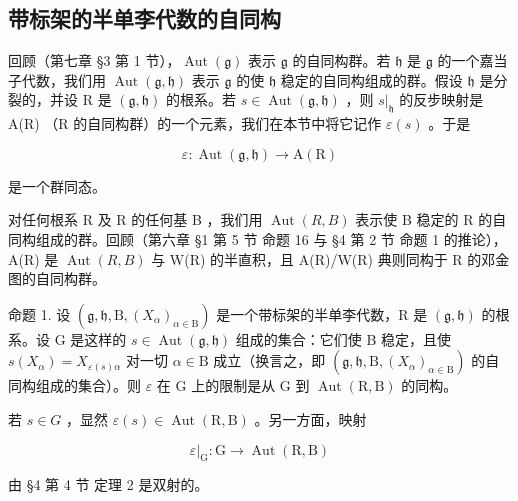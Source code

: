 \subsection{带标架的半单李代数的自同构}

回顾（第七章 §3 第 1 节），\(\operatorname{Aut}(\mathfrak{g})\) 表示 \(\mathfrak{g}\) 的自同构群。若 \(\mathfrak{h}\) 是 \(\mathfrak{g}\) 的一个嘉当子代数，我们用 \(\operatorname{Aut}(\mathfrak{g},\mathfrak{h})\) 表示 \(\mathfrak{g}\) 的使 \(\mathfrak{h}\) 稳定的自同构组成的群。假设 \(\mathfrak{h}\) 是分裂的，并设 R 是 \((\mathfrak{g},\mathfrak{h})\) 的根系。若 \(s\in\operatorname{Aut}(\mathfrak{g},\mathfrak{h})\) ，则 \(s|_{\mathfrak{h}}\) 的反步映射是 A(R) （R 的自同构群）的一个元素，我们在本节中将它记作 \(\varepsilon(s)\) 。于是

\[
\varepsilon : \operatorname{Aut} (\mathfrak {g}, \mathfrak {h}) \to \mathrm{A} (\mathrm{R})
\]

是一个群同态。

对任何根系 R 及 R 的任何基 B ，我们用 \(\operatorname{Aut}(R,B)\) 表示使 B 稳定的 R 的自同构组成的群。回顾（第六章 §1 第 5 节 命题 16 与 §4 第 2 节 命题 1 的推论），A(R) 是 \(\operatorname{Aut}(R,B)\) 与 W(R) 的半直积，且 A(R)/W(R) 典则同构于 R 的邓金图的自同构群。

命题 1. 设 \((\mathfrak{g},\mathfrak{h},\mathrm{B},(X_{\alpha})_{\alpha \in \mathrm{B}})\) 是一个带标架的半单李代数，R 是 \((\mathfrak{g},\mathfrak{h})\) 的根系。设 G 是这样的 \(s\in \operatorname {Aut}(\mathfrak{g},\mathfrak{h})\) 组成的集合：它们使 B 稳定，且使 \(s(X_{\alpha}) = X_{\varepsilon (s)\alpha}\) 对一切 \(\alpha \in \mathrm{B}\) 成立（换言之，即 \((\mathfrak{g},\mathfrak{h},\mathrm{B},(X_{\alpha})_{\alpha \in \mathrm{B}})\) 的自同构组成的集合）。则 \(\varepsilon\) 在 \(\mathrm{G}\) 上的限制是从 \(\mathrm{G}\) 到 \(\operatorname {Aut}(\mathrm{R},\mathrm{B})\) 的同构。

若 \(s \in G\) ，显然 \(\varepsilon(s) \in \operatorname{Aut}(\mathrm{R}, \mathrm{B})\) 。另一方面，映射

\[
\varepsilon|_{\mathrm{G}}: \mathrm{G} \rightarrow \operatorname{Aut} (\mathrm{R}, \mathrm{B})
\]

由 §4 第 4 节 定理 2 是双射的。


